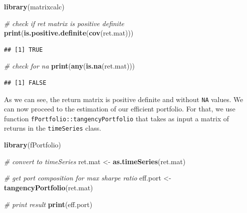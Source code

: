 \documentclass[11pt,]{book}
\newenvironment{Shaded}{\begin{snugshade}}{\end{snugshade}}
\newcommand{\KeywordTok}[1]{\textcolor[rgb]{0.27,0.27,0.27}{\textbf{#1}}}
\newcommand{\StringTok}[1]{\textcolor[rgb]{0.5,0.5,0.5}{#1}}
\newcommand{\CommentTok}[1]{\textcolor[rgb]{0.56,0.35,0.01}{\textit{#1}}}
\newcommand{\NormalTok}[1]{#1}
\begin{document}
\begin{Shaded}
\begin{Highlighting}[]
\KeywordTok{library}\NormalTok{(matrixcalc)}

\CommentTok{# check if ret matrix is positive definite}
\KeywordTok{print}\NormalTok{(}\KeywordTok{is.positive.definite}\NormalTok{(}\KeywordTok{cov}\NormalTok{(ret.mat)))}
\end{Highlighting}
\end{Shaded}

\begin{verbatim}
## [1] TRUE
\end{verbatim}

\begin{Shaded}
\begin{Highlighting}[]
\CommentTok{# check for na}
\KeywordTok{print}\NormalTok{(}\KeywordTok{any}\NormalTok{(}\KeywordTok{is.na}\NormalTok{(ret.mat)))}
\end{Highlighting}
\end{Shaded}

\begin{verbatim}
## [1] FALSE
\end{verbatim}

As we can see, the return matrix is positive definite and without
\texttt{NA} values. We can now proceed to the estimation of our
efficient portfolio. For that, we use function
\texttt{fPortfolio::tangencyPortfolio} that takes as input a matrix of
returns in the \texttt{timeSeries} class. 

\begin{Shaded}
\begin{Highlighting}[]
\KeywordTok{library}\NormalTok{(fPortfolio)}

\CommentTok{# convert to timeSeries}
\NormalTok{ret.mat <-}\StringTok{ }\KeywordTok{as.timeSeries}\NormalTok{(ret.mat)}

\CommentTok{# get port composition for max sharpe ratio}
\NormalTok{eff.port <-}\StringTok{ }\KeywordTok{tangencyPortfolio}\NormalTok{(ret.mat)}

\CommentTok{# print result}
\KeywordTok{print}\NormalTok{(eff.port)}
\end{Highlighting}
\end{Shaded}
\end{document}
